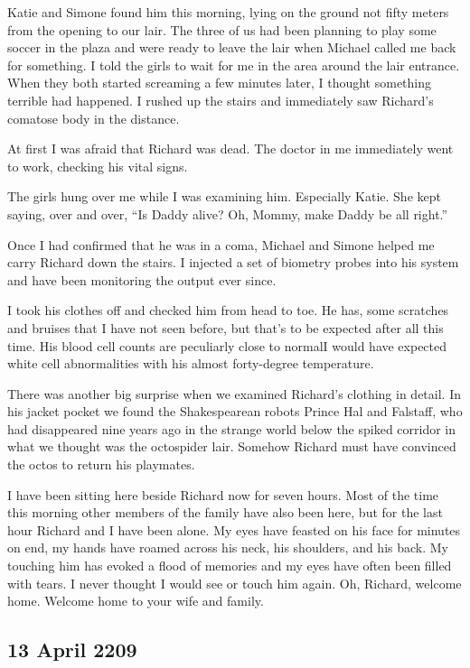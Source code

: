 \documentclass[]{article}
\begin{document}
{Katie and Simone found him this morning, lying on the ground not fifty meters from the opening to our lair.  The three of us had been planning to play some soccer in the plaza and were ready to leave the lair when Michael called me back for something.  I told the girls to wait for me in the area around the lair entrance.  When they both started screaming a few minutes later, I thought something terrible had happened.  I rushed up the stairs and immediately saw Richard’s comatose body in the distance.

At first I was afraid that Richard was dead.  The doctor in me immediately went to work, checking his vital signs.

The girls hung over me while I was examining him.  Especially Katie.  She kept saying, over and over, “Is Daddy alive? Oh, Mommy, make Daddy be all right.”

Once I had confirmed that he was in a coma, Michael and Simone helped me carry Richard down the stairs.  I injected a set of biometry probes into his system and have been monitoring the output ever since.

I took his clothes off and checked him from head to toe.  He has, some scratches and bruises that I have not seen before, but that’s to be expected after all this time.  His blood cell counts are peculiarly close to normalI would have expected white cell abnormalities with his almost forty-degree temperature.

There was another big surprise when we examined Richard’s clothing in detail.  In his jacket pocket we found the Shakespearean robots Prince Hal and Falstaff, who had disappeared nine years ago in the strange world below the spiked corridor in what we thought was the octospider lair.  Somehow Richard must have convinced the octos to return his playmates.

I have been sitting here beside Richard now for seven hours.  Most of the time this morning other members of the family have also been here, but for the last hour Richard and I have been alone.  My eyes have feasted on his face for minutes on end, my hands have roamed across his neck, his shoulders, and his back.  My touching him has evoked a flood of memories and my eyes have often been filled with tears.  I never thought I would see or touch him again.  Oh, Richard, welcome home.  Welcome home to your wife and family.

\subsection*{13 April 2209}

}
\end{document}
